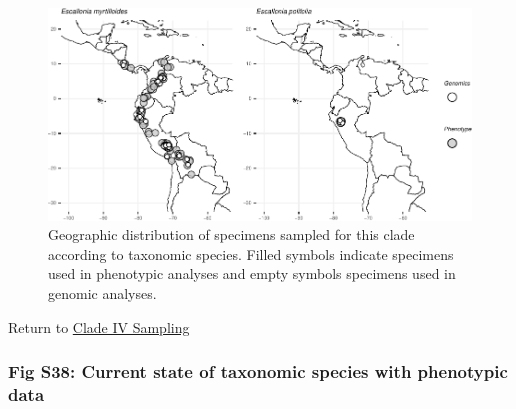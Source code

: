 \documentclass[
  11pt,
]{article}
\begin{document}
\begin{figure}

{\centering \includegraphics{Supplementary_Material_files/figure-latex/CladeIVsamplingMaps-1} 

}

\caption{Geographic distribution of specimens sampled for this clade according to taxonomic species. Filled symbols indicate specimens used in phenotypic analyses and empty symbols specimens used in genomic analyses.}\label{fig:CladeIVsamplingMaps}
\end{figure}

Return to \protect\hyperlink{sampling-4}{Clade IV Sampling}
\pagebreak

\hypertarget{fig-s38-current-state-of-taxonomic-species-with-phenotypic-data}{%
\subsubsection{Fig S38: Current state of taxonomic species with phenotypic data}\label{fig-s38-current-state-of-taxonomic-species-with-phenotypic-data}}
\end{document}
